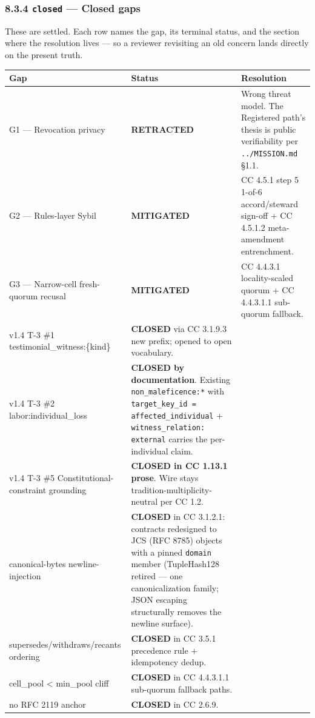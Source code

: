 \documentclass[11pt]{article}
\begin{document}
\subsubsection*{8.3.4 \texttt{closed} — Closed gaps}


These are settled. Each row names the gap, its terminal status, and the section where the resolution lives — so a reviewer revisiting an old concern lands directly on the present truth.


{\footnotesize
\begin{longtable}{|p{5.33cm}|p{5.33cm}|p{5.33cm}|}\hline
\textbf{Gap} & \textbf{Status} & \textbf{Resolution} \\ \hline\endhead
G1 — Revocation privacy & \textbf{RETRACTED} & Wrong threat model. The Registered path's thesis is public verifiability per \texttt{../MISSION.md} §1.1. \\ \hline
G2 — Rules-layer Sybil & \textbf{MITIGATED} & CC 4.5.1 step 5 1-of-6 accord/steward sign-off + CC 4.5.1.2 meta-amendment entrenchment. \\ \hline
G3 — Narrow-cell fresh-quorum recusal & \textbf{MITIGATED} & CC 4.4.3.1 locality-scaled quorum + CC 4.4.3.1.1 sub-quorum fallback. \\ \hline
v1.4 T-3 \#1 testimonial\_witness:\{kind\} & \textbf{CLOSED} via CC 3.1.9.3 new prefix; opened to open vocabulary. &  \\ \hline
v1.4 T-3 \#2 labor:individual\_loss & \textbf{CLOSED by documentation}. Existing \texttt{non\_maleficence:*} with \texttt{target\_key\_id = affected\_individual} + \texttt{witness\_relation: external} carries the per-individual claim. &  \\ \hline
v1.4 T-3 \#5 Constitutional-constraint grounding & \textbf{CLOSED in CC 1.13.1 prose}. Wire stays tradition-multiplicity-neutral per CC 1.2. &  \\ \hline
canonical-bytes newline-injection & \textbf{CLOSED} in CC 3.1.2.1: contracts redesigned to JCS (RFC 8785) objects with a pinned \texttt{domain} member (TupleHash128 retired — one canonicalization family; JSON escaping structurally removes the newline surface). &  \\ \hline
supersedes/withdraws/recants ordering & \textbf{CLOSED} in CC 3.5.1 precedence rule + idempotency dedup. &  \\ \hline
cell\_pool < min\_pool cliff & \textbf{CLOSED} in CC 4.4.3.1.1 sub-quorum fallback paths. &  \\ \hline
no RFC 2119 anchor & \textbf{CLOSED} in CC 2.6.9. &  \\ \hline

\end{longtable}}
\end{document}
